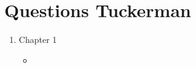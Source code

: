 \section{Questions Tuckerman}

\begin{enumerate}
    \item Chapter 1
    \begin{itemize}
        \item 
    \end{itemize}

\end{enumerate}